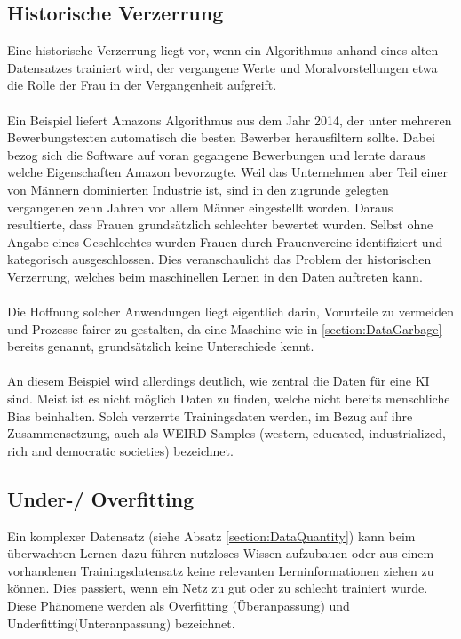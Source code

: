 \documentclass[12pt,oneside,a4paper,parskip]{scrbook}
\begin{document}
\subsection{Historische Verzerrung}
\label{section:biasInTest}
Eine historische Verzerrung liegt vor, wenn ein Algorithmus anhand eines alten Datensatzes trainiert wird, der vergangene Werte und Moralvorstellungen etwa die Rolle der Frau in der Vergangenheit aufgreift\cite{kipedia}.
\\\\
Ein Beispiel liefert Amazons Algorithmus aus dem Jahr 2014, der unter mehreren Bewerbungstexten automatisch die besten Bewerber herausfiltern sollte. Dabei bezog sich die Software auf voran gegangene Bewerbungen und lernte daraus welche Eigenschaften Amazon bevorzugte. Weil das Unternehmen aber Teil einer von Männern dominierten Industrie ist, sind in den zugrunde gelegten vergangenen zehn Jahren vor allem Männer eingestellt worden. Daraus resultierte, dass Frauen grundsätzlich schlechter bewertet wurden. Selbst ohne Angabe eines Geschlechtes wurden Frauen durch Frauenvereine identifiziert und kategorisch ausgeschlossen. Dies veranschaulicht das Problem der historischen Verzerrung, welches beim maschinellen Lernen in den Daten auftreten kann\cite{amazon}.
\\\\
Die Hoffnung solcher Anwendungen liegt eigentlich darin, Vorurteile zu vermeiden und Prozesse fairer zu gestalten, da eine Maschine wie in \ref{section:DataGarbage} bereits genannt, grundsätzlich keine Unterschiede kennt.
\\\\
An diesem Beispiel wird allerdings deutlich, wie zentral die Daten für eine KI sind.
Meist ist es nicht möglich Daten zu finden, welche nicht bereits menschliche Bias beinhalten. Solch verzerrte Trainingsdaten werden, im Bezug auf ihre Zusammensetzung, auch als WEIRD Samples (western, educated, industrialized, rich and democratic societies) bezeichnet\cite{BiasInKi}.

\subsection{Under-/ Overfitting}
\label{section:OverUnderfitting}

Ein komplexer Datensatz (siehe Absatz \ref{section:DataQuantity}) kann beim überwachten Lernen dazu führen nutzloses Wissen aufzubauen oder aus einem vorhandenen Trainingsdatensatz keine relevanten Lerninformationen ziehen zu können.
Dies passiert, wenn ein Netz zu gut oder zu schlecht trainiert wurde. Diese Phänomene werden als Overfitting (Überanpassung) und Underfitting(Unteranpassung) bezeichnet.
\end{document}
